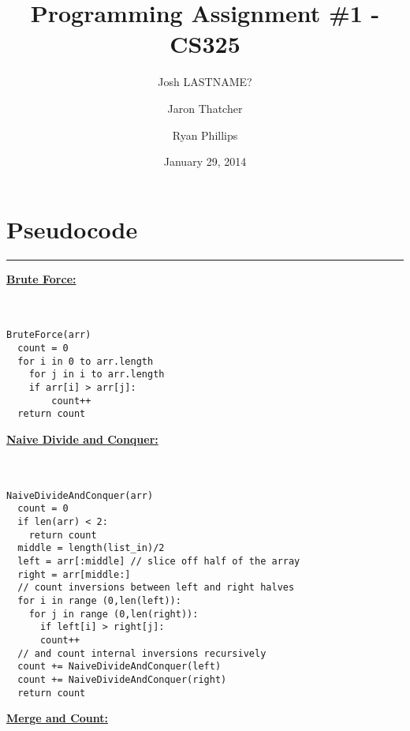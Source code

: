 \documentclass[letterpaper,10pt,titlepage,fleqn]{article}
\begin{document}
\lstset{language=Python} 

\title{Programming Assignment \#1 - CS325}

\author{
	Josh LASTNAME? \and
	Jaron Thatcher \and
	Ryan Phillips
}

\date{January 29, 2014}
\maketitle

\section*{Pseudocode}
\hrule
\begin{centering}

\underline{\large{\textbf{Brute Force:}}}\\\\\\
\end{centering}
\begin{lstlisting}
BruteForce(arr)
  count = 0
  for i in 0 to arr.length
    for j in i to arr.length
	if arr[i] > arr[j]:
        count++ 
  return count
\end{lstlisting}

\begin{centering}
\underline{\large{\textbf{Naive Divide and Conquer:}}}\\\\\\
\end{centering}
\begin{lstlisting}
NaiveDivideAndConquer(arr)
  count = 0
  if len(arr) < 2:
    return count
  middle = length(list_in)/2
  left = arr[:middle] // slice off half of the array
  right = arr[middle:]
  // count inversions between left and right halves
  for i in range (0,len(left)):
    for j in range (0,len(right)):
      if left[i] > right[j]:
	  count++
  // and count internal inversions recursively
  count += NaiveDivideAndConquer(left)
  count += NaiveDivideAndConquer(right)
  return count
\end{lstlisting}

\begin{centering}
\underline{\large{\textbf{Merge and Count:}}}\\\\\\
\end{centering}
\end{document}
